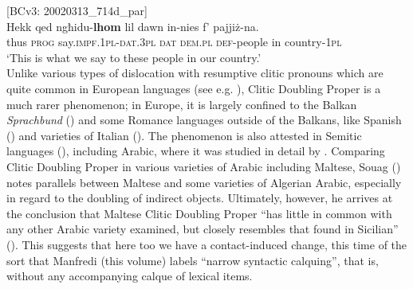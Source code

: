 \documentclass[output=paper]{langsci/langscibook}
\begin{document}
\z
\ea\label{cdp02} 
{[BCv3: 20020313\_714d\_par]}\\
\gll Hekk qed ngħidu-\textbf{lhom} lil dawn in-nies f' pajjiż-na.\\
	thus \textsc{prog} say.\textsc{impf.1pl}-\textsc{dat.3pl} \textsc{dat} \textsc{dem.pl} \textsc{def}-people in country-\textsc{1pl}\\
	\glt `This is what we say to these people in our country.'\\
\z
Unlike various types of dislocation with resumptive clitic pronouns which are quite common in European languages (see e.g. \citealt{Decat2010}), Clitic Doubling Proper is a much rarer phenomenon; in Europe, it is largely confined to the Balkan \textit{Sprachbund} (\citealt{Friedman2008}) and some Romance languages outside of the Balkans, like Spanish (\citealt[7]{Zagona2002}) and varieties of Italian (\citealt[231--233]{Russi2008}). The phenomenon is also attested in Semitic languages (\citealt{Khan1984}), including Arabic, where it was studied in detail by \cite{Souag2017clitic}. Comparing Clitic Doubling Proper in various varieties of Arabic including Maltese, Souag (\citeyear[57]{Souag2017clitic}) notes parallels between Maltese and some varieties of Algerian Arabic, especially in regard to the doubling of indirect objects. Ultimately, however, he arrives at the conclusion that Maltese Clitic Doubling Proper ``has little in common with any other Arabic variety examined, but closely resembles that found in Sicilian'' (\citealt[60]{Souag2017clitic}). This suggests that here too we have a contact-induced change, this time of the sort that Manfredi (this volume) labels ``narrow syntactic calquing'', that is, without any accompanying calque of lexical items.
\end{document}
